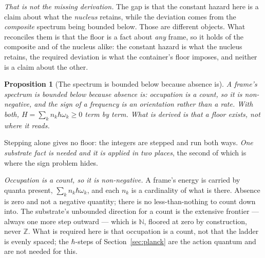\documentclass[11pt,a4paper]{article}
\newtheorem{proposition}[definition]{Proposition}
\theoremstyle{remark}\newtheorem{remark}[definition]{Remark}
\begin{document}
\emph{That is not the missing derivation.} The gap is that the constant hazard here is a claim about
what the \emph{nucleus} retains, while the deviation comes from the \emph{composite} spectrum being
bounded below. Those are different objects. What reconciles them is that the floor is a fact about
\emph{any} frame, so it holds of the composite and of the nucleus alike: the constant hazard is what
the nucleus retains, the required deviation is what the container's floor imposes, and neither is a
claim about the other.

\begin{proposition}[The spectrum is bounded below because absence is]\label{prop:spectrum-floor}
A frame's spectrum is bounded below because absence is: occupation is a count, so it is non-negative,
and the sign of a frequency is an orientation rather than a rate. With both,
$H=\sum_k n_k\hbar\omega_k\ge 0$ term by term. What is derived is that a floor \emph{exists}, not
where it reads.
\end{proposition}

Stepping alone gives no floor: the integers are stepped and run both ways. \emph{One substrate fact is needed and it is applied in two places}, the second of which is where
the sign problem hides.

\emph{Occupation is a count, so it is non-negative.} A frame's energy is carried by quanta present,
$\sum_k n_k\hbar\omega_k$, and each $n_k$ is a cardinality of what is there. Absence is zero and not
a negative quantity; there is no less-than-nothing to count down into. The substrate's unbounded
direction for a count is the extensive frontier --- always one more step outward --- which is
$\mathbb{N}$, floored at zero by construction, never $\mathbb{Z}$. What is required here is that
occupation is a count, not that the ladder is evenly spaced; the $\hbar$-steps of
Section~\ref{sec:planck} are the action quantum and are not needed for this.
\end{document}
